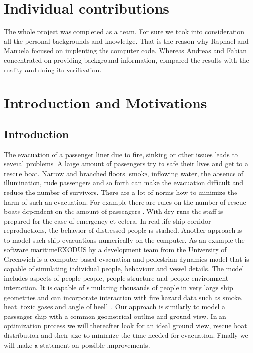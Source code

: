 \documentclass[11pt]{article}
\begin{document}
\section{Individual contributions}
The whole project was completed as a team. For sure we took into consideration all the personal backgrounds and  knowledge. That is the reason why Raphael and Manuela focused on implenting the computer code. Whereas Andreas and Fabian concentrated on providing background information, compared the results with the reality and doing its verification.





\newpage
\section{Introduction and Motivations}
\subsection{Introduction}
The evacuation of a passenger liner due to fire, sinking or other issues leads to several problems. A large amount of passengers try to safe their lives and get to a rescue boat. Narrow and branched floors, smoke, inflowing water, the absence of illumination, rude passengers and so forth can make the evacuation difficult and reduce the number of survivors.
There are a lot of norms how to minimize the harm of such an evacuation. For example there are rules on the number of rescue boats dependent on the amount of passengers \cite{SOLAS}. With dry runs the staff is prepared for the case of emergency et cetera. In real life ship corridor reproductions, the behavior of distressed people is studied.
Another approach is to model such ship evacuations numerically on the computer. As an example the software maritimeEXODUS by a development team from the University of Greenwich is a computer based evacuation and pedestrian dynamics model that is capable of simulating individual people, behaviour and vessel details. The model includes aspects of people-people, people-structure and people-environment interaction. It is capable of simulating thousands of people in very large ship geometries and can incorporate interaction with fire hazard data such as smoke, heat, toxic gases and angle of heel” \cite{EXODUS}.
Our approach is similarly to model a passenger ship with a common geometrical outline and ground view. In an optimization process we will thereafter look for an ideal ground view, rescue boat distribution and their size to minimize the time needed for evacuation. Finally we will make a statement on possible improvements.
\end{document}
